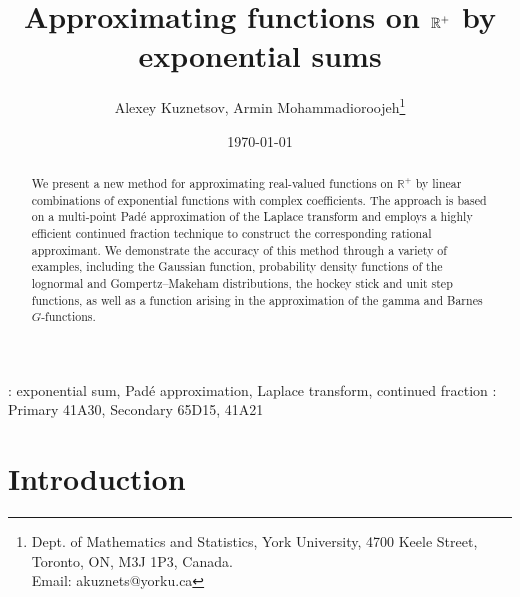 \documentclass[12pt]{article}
\title{Approximating functions on $\r^+$ by exponential sums}
\author{ 
{Alexey Kuznetsov,  Armin Mohammadioroojeh\footnote{Dept. of Mathematics and Statistics,  York University,
4700 Keele Street, Toronto, ON, M3J 1P3, Canada.  \\
 Email: akuznets@yorku.ca}} }
\date{\today}
\def\r{{\mathbb R}}
\begin{document}
\maketitle

\begin{abstract}
We present a new method for approximating real-valued functions on $\r^+$ by linear combinations of exponential functions with complex coefficients. The approach is based on a multi-point Padé approximation of the Laplace transform and employs a highly efficient continued fraction technique to construct the corresponding rational approximant. We demonstrate the accuracy of this method through a variety of examples, including the Gaussian function, probability density functions of the lognormal and Gompertz–Makeham distributions, the hockey stick and unit step functions, as well as a function arising in the approximation of the gamma and Barnes $G$-functions.     
\end{abstract}

{\vskip 0.15cm}
 : exponential sum, Pad\'e approximation, Laplace transform, continued fraction
{\vskip 0.25cm}
 : Primary 41A30,  Secondary 65D15, 41A21
\section{Introduction}
\end{document}
